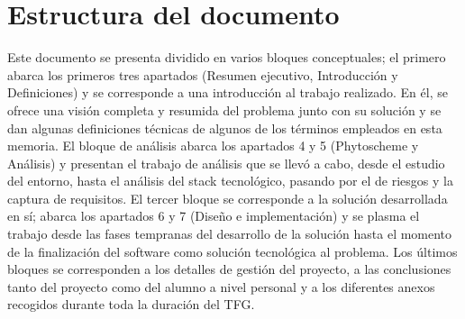 \section{Estructura del documento}
	
Este documento se presenta dividido en varios bloques conceptuales; el primero abarca los primeros tres apartados (Resumen ejecutivo, Introducción  y Definiciones) y se corresponde a una introducción al trabajo realizado. En él, se ofrece una visión completa y resumida del problema junto con su solución y se dan algunas definiciones técnicas de algunos de los términos empleados en esta memoria. El bloque de análisis abarca los apartados 4 y 5 (Phytoscheme y Análisis) y presentan el trabajo de análisis que se llevó a cabo, desde el estudio del entorno, hasta el análisis del stack tecnológico, pasando por el de riesgos y la captura de requisitos. El tercer bloque se corresponde a la solución desarrollada en sí; abarca los apartados 6 y 7 (Diseño e implementación) y se plasma el trabajo desde las fases tempranas del desarrollo de la solución hasta el momento de la finalización del software como solución tecnológica al problema.  Los últimos bloques se corresponden a los detalles de gestión del proyecto, a las conclusiones tanto del proyecto como del alumno a nivel personal y a los diferentes anexos recogidos durante toda la duración del TFG.
